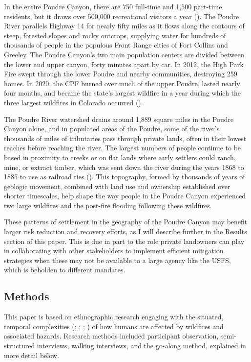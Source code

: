 \documentclass[
]{article}
\begin{document}
In the entire Poudre Canyon, there are 750 full-time and 1,500 part-time residents, but it draws over 500,000 recreational visitors a year (). The Poudre River parallels Highway 14 for nearly fifty miles as it flows along the contours of steep, forested slopes and rocky outcrops, supplying water for hundreds of thousands of people in the populous Front Range cities of Fort Collins and Greeley. The Poudre Canyon's two main population centers are divided between the lower and upper canyon, forty minutes apart by car. In 2012, the High Park Fire swept through the lower Poudre and nearby communities, destroying 259 homes. In 2020, the CPF burned over much of the upper Poudre, lasted nearly four months, and became the state's largest wildfire in a year during which the three largest wildfires in Colorado occurred ().

The Poudre River watershed drains around 1,889 square miles in the Poudre Canyon alone, and in populated areas of the Poudre, some of the river's thousands of miles of tributaries pass through private lands, often in their lowest reaches before reaching the river. The largest numbers of people continue to be based in proximity to creeks or on flat lands where early settlers could ranch, mine, or extract timber, which was sent down the river during the years 1868 to 1885 to use as railroad ties (). This topography, formed by thousands of years of geologic movement, combined with land use and ownership established over shorter timescales, help shape the way people in the Poudre Canyon experienced two large wildfires and the post-fire flooding following these wildfires.

These patterns of settlement in the geography of the Poudre Canyon may benefit larger risk reduction and recovery efforts, as I will describe further in the Results section of this paper. This is due in part to the role private landowners can play in collaborating with other stakeholders to implement efficient mitigation strategies when these may not be available to a large agency like the USFS, which is beholden to different mandates.

\subsection{Methods}\label{methods-1}

This paper is based on ethnographic research engaging with the situated, temporal complexities (; ; ; ) of how humans are affected by wildfires and associated hazards. Research methods included participant observation, semi-structured interviews, walking interviews, and the go-along method, explained in more detail below.
\end{document}
